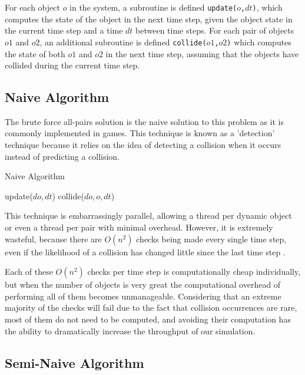 \documentclass[CEJCS,PDF]{cej} %
\begin{document}
For each object $o$ in the system, a subroutine is defined \texttt{update($o$,$dt$)}, which computes the state of the object in the next time step, given the object state in the current time step and a time $dt$ between time steps.  For each pair of objects $o1$ and $o2$, an additional subroutine is defined \texttt{collide($o1$,$o2$)} which computes the state of both $o1$ and $o2$ in the next time step, assuming that the objects have collided during the current time step.

\subsection{Naive Algorithm}

The brute force all-pairs solution is the naive solution to this problem as it is commonly implemented in games. This technique is known as a 'detection' technique because it relies on the idea of detecting a collision when it occurs instead of predicting a collision.  

\begin{algorithm}
\caption{Naive Algorithm}
\begin{algorithmic}
		\STATE update($do,dt$)  
				\STATE collide($do, o, dt$)
			\ENDIF
		\ENDFOR
	\ENDFOR
\ENDFOR
\end{algorithmic}
\end{algorithm}

This technique is embarrassingly parallel, allowing a thread per dynamic object or even a thread per pair with minimal overhead.  However, it is extremely
wasteful, because there are $O(n^2)$ checks being made every single time step, even if the likelihood of a collision has changed little since the last time step \cite{Seningood}.  

Each of these $O(n^2)$ checks per time step is computationally cheap individually, but when the number of objects is very great the computational overhead of performing all of them becomes
unmanageable. Considering that an extreme majority of the checks will fail due to the fact that collision occurrences are rare, most of them do not need to be computed, and avoiding their computation has the ability to dramatically increase the 
throughput of our simulation.

\subsection{Semi-Naive Algorithm}
\end{document}
